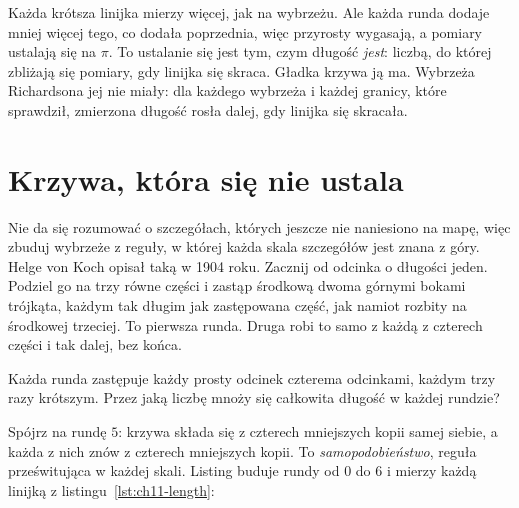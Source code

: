 

\noindent
Każda krótsza linijka mierzy więcej, jak na wybrzeżu. Ale każda runda dodaje
mniej więcej  tego, co dodała poprzednia, więc przyrosty
wygasają, a pomiary ustalają się na $\pi$. To ustalanie się jest tym, czym
długość \emph{jest}: liczbą, do której zbliżają się pomiary, gdy linijka się
skraca. Gładka krzywa ją ma. Wybrzeża Richardsona jej nie miały: dla każdego
wybrzeża i każdej granicy, które sprawdził, zmierzona długość rosła dalej,
gdy linijka się skracała.

\section{Krzywa, która się nie ustala}
\label{sec:ch11-koch}

\noindent
Nie da się rozumować o szczegółach, których jeszcze nie naniesiono na mapę,
więc zbuduj wybrzeże z reguły, w której każda skala szczegółów jest znana z
góry. Helge von Koch opisał taką w 1904 roku. Zacznij od odcinka o długości
jeden. Podziel go na trzy równe części i zastąp środkową dwoma górnymi
bokami trójkąta, każdym tak długim jak zastępowana część, jak namiot
rozbity na środkowej trzeciej. To pierwsza runda. Druga robi to samo z każdą
z czterech części i tak dalej, bez końca.

\begin{think}
Każda runda zastępuje każdy prosty odcinek czterema odcinkami, każdym trzy
razy krótszym. Przez jaką liczbę mnoży się całkowita długość w każdej
rundzie?
\end{think}


\noindent
Spójrz na rundę $5$: krzywa składa się z czterech mniejszych kopii samej
siebie, a każda z nich znów z czterech mniejszych kopii. To
\emph{samopodobieństwo}, reguła prześwitująca w każdej skali. Listing buduje
rundy od $0$ do $6$ i mierzy każdą linijką z listingu~\ref{lst:ch11-length}:

